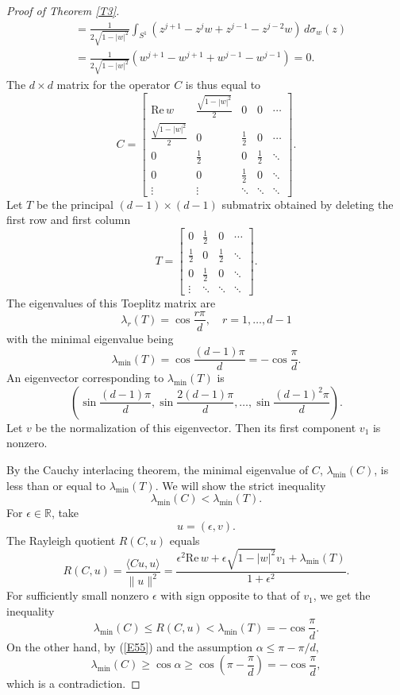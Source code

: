 \documentclass[reqno]{amsart}
\theoremstyle{definition}
\newcommand{\R}{\mathbb{R}}
\newcommand\Real{\mathrm{Re}}
\numberwithin{equation}{section}
\begin{document}
\begin{proof}[Proof of Theorem \ref{T3}]
\begin{align*}
 	&=\frac{1}{2\sqrt{1-|w|^2}}\int_{S^1}(z^{j+1}-z^jw+z^{j-1}-z^{j-2}w)\,d\sigma_w(z)\\
 	&=\frac{1}{2\sqrt{1-|w|^2}}(w^{j+1}-w^{j+1}+w^{j-1}-w^{j-1})=0.
 \end{align*}
 The $d\times d$ matrix for the operator $C$ is thus equal to
 \[C=\begin{bmatrix} \Real\,w &\frac{\sqrt{1-|w|^2}}{2}&0&0&\cdots\\
 \frac{\sqrt{1-|w|^2}}{2}&0&\frac12&0&\cdots\\
 0&\frac12&0&\frac12&\ddots\\
 0&0&\frac12&0&\ddots\\
\vdots&\vdots&\ddots&\ddots&\ddots
\end{bmatrix}.	
\]
Let $T$ be the principal $(d-1)\times (d-1)$ submatrix obtained by deleting the first row and first column
\[T=\begin{bmatrix}
 0&\frac12&0&\cdots\\
 \frac12&0&\frac12&\ddots\\
 0&\frac12&0&\ddots\\
\vdots&\ddots&\ddots&\ddots
\end{bmatrix}.	
\]
The eigenvalues of this Toeplitz matrix are 
\[\lambda_r(T)=\cos\frac{r\pi}{d},\quad r=1,\ldots,d-1\]
with the minimal eigenvalue being
\[\lambda_{\min}(T)=\cos\frac{(d-1)\pi}{d}=-\cos{\frac{\pi}{d}}.\]
An eigenvector corresponding to $\lambda_{\min}(T)$ is
\[\left(\sin\frac{(d-1)\pi}{d},\sin\frac{2(d-1)\pi}{d},\ldots,\sin\frac{(d-1)^2\pi}{d}\right).\]
Let $v$ be the normalization of this eigenvector. Then its first component $v_1$ is nonzero. 

By the Cauchy interlacing theorem, the minimal eigenvalue of $C$, $\lambda_{\min}(C)$, is less than or equal to $\lambda_{\min}(T)$. We will show the strict inequality
\[\lambda_{\min}(C)<\lambda_{\min}(T).\]
For $\epsilon\in\R$, take
\[u=(\epsilon,v).\]
The Rayleigh quotient $R(C,u)$ equals
\[R(C,u)=\frac{\langle Cu,u\rangle}{\|u\|^2}=\frac{\epsilon^2 \Real\,w+ \epsilon\sqrt{1-|w|^2}v_1+\lambda_{\min}(T)}{1+\epsilon^2}.\]
For sufficiently small nonzero $\epsilon$ with sign opposite to that of  $v_1$, we get the inequality
\[\lambda_{\min}(C)\le R(C,u)<\lambda_{\min}(T)=-\cos\frac{\pi}{d}.\]
On the other hand, by (\ref{E55}) and the assumption $\alpha\le \pi-\pi/d,$
\[\lambda_{\min}(C)\ge\cos \alpha\ge \cos\left(\pi-\frac{\pi}{d}\right)=-\cos\frac{\pi}{d},\]
 which is a contradiction.
\end{proof}
\end{document}
